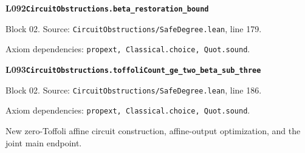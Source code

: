 \begin{minipage}{\linewidth}
\hypertarget{L092}{}
{\small\sffamily\bfseries\color{ink}L092\quad\nolinkurl{CircuitObstructions.beta_restoration_bound}}\par
{\scriptsize\sffamily\color{muted}Block 02. Source: \nolinkurl{CircuitObstructions/SafeDegree.lean}, line 179.}\par
{}
{\scriptsize\sffamily\color{muted}Axiom dependencies: \nolinkurl{propext, Classical.choice, Quot.sound}.}
\end{minipage}\par\medskip
\begin{minipage}{\linewidth}
\hypertarget{L093}{}
{\small\sffamily\bfseries\color{ink}L093\quad\nolinkurl{CircuitObstructions.toffoliCount_ge_two_beta_sub_three}}\par
{\scriptsize\sffamily\color{muted}Block 02. Source: \nolinkurl{CircuitObstructions/SafeDegree.lean}, line 186.}\par
{}
{\scriptsize\sffamily\color{muted}Axiom dependencies: \nolinkurl{propext, Classical.choice, Quot.sound}.}
\end{minipage}\par\medskip
{}
New zero-Toffoli affine circuit construction, affine-output optimization, and the joint main endpoint.
\par\medskip

